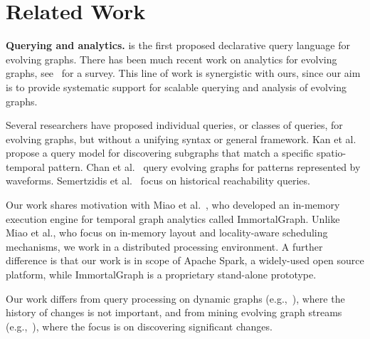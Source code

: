 \section{Related Work}
\label{sec:related}


{\bf Querying and analytics.} \ql is the first proposed declarative
query language for evolving graphs.  There has been much recent work
on analytics for evolving graphs,
see~\cite{DBLP:journals/csur/AggarwalS14} for a survey. This line of
work is synergistic with ours, since our aim is to provide systematic
support for scalable querying and analysis of evolving graphs.

Several researchers have proposed individual queries, or classes of
queries, for evolving graphs, but without a unifying syntax or general
framework.  Kan et al.~\cite{Kan2009} propose a query model for
discovering subgraphs that match a specific spatio-temporal pattern.
Chan et al.~\cite{Chan2008} query evolving graphs for patterns
represented by waveforms.  Semertzidis et al.~\cite{Semertzidis2015}
focus on historical reachability queries.

Our work shares motivation with Miao et
al.~\cite{DBLP:journals/tos/MiaoHLWYZPCC15}, who developed an
in-memory execution engine for temporal graph analytics called
ImmortalGraph.  Unlike Miao et al., who focus on in-memory layout and
locality-aware scheduling mechanisms, we work in a distributed
processing environment.  A further difference is that our work is in
scope of Apache Spark, a widely-used open source platform, while
ImmortalGraph is a proprietary stand-alone prototype.


Our work differs from query processing on dynamic graphs
(e.g.,~\cite{Mondal2012}), where the history of changes is not
important, and from mining evolving graph streams
(e.g.,~\cite{Liu2010}), where the focus is on discovering significant
changes.

